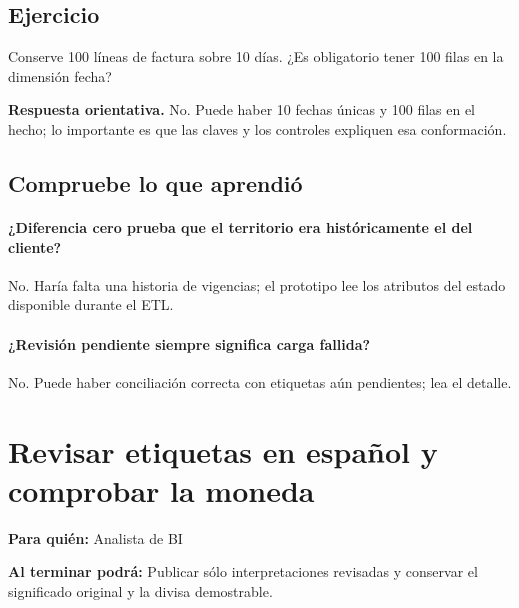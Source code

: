 \subsection{Ejercicio}
Conserve 100 líneas de factura sobre 10 días. ¿Es obligatorio tener 100 filas en la dimensión fecha?

\textbf{Respuesta orientativa.} No. Puede haber 10 fechas únicas y 100 filas en el hecho; lo importante es que las claves y los controles expliquen esa conformación.

\subsection{Compruebe lo que aprendió}
\paragraph{¿Diferencia cero prueba que el territorio era históricamente el del cliente?} No. Haría falta una historia de vigencias; el prototipo lee los atributos del estado disponible durante el ETL.

\paragraph{¿Revisión pendiente siempre significa carga fallida?} No. Puede haber conciliación correcta con etiquetas aún pendientes; lea el detalle.

\endgroup
{}

\begingroup
\setlength{\parskip}{4pt plus 1pt minus 1pt}
\titlespacing*{\paragraph}{0pt}{4pt}{0.5em}
\section{Revisar etiquetas en español y comprobar la moneda}
\label{unidad:ETL06}
\textbf{Para quién:} Analista de BI\par
\textbf{Al terminar podrá:} Publicar sólo interpretaciones revisadas y conservar el significado original y la divisa demostrable.

